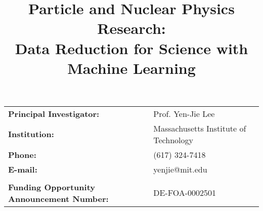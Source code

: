 \begin{titlepage}
\vspace{2.2 cm}
\title{\textbf{Particle and Nuclear Physics Research: \\
Data Reduction for Science with Machine Learning\\
}}

\vspace{.2 cm} 

\begin{center}
\begin{tabular}{ll}
 
\textbf{Principal Investigator:} & Prof. Yen-Jie Lee \\
\textbf{Institution:}                    & Massachusetts Institute of Technology \\
\textbf{Phone:} & 			(617) 324-7418 \\
\textbf{E-mail:} & 			yenjie@mit.edu \\
& \\
\textbf{Funding Opportunity Announcement Number:} & 	DE-FOA-0002501 \\

\end{tabular}
\end{center}



\end{titlepage}





